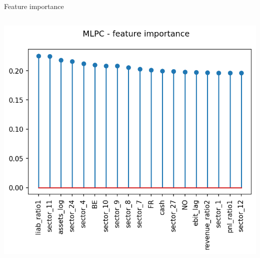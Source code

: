 \documentclass{beamer}
\begin{document}
\begin{frame}{Feature importance}
\begin{columns}
\begin{column}{.5\textwidth}
\begin{center}
        \includegraphics[scale=0.42]{img/mlpc_exp.png}
		\end{center}
    \end{column}%
    
\end{columns}
\end{frame}
\end{document}
